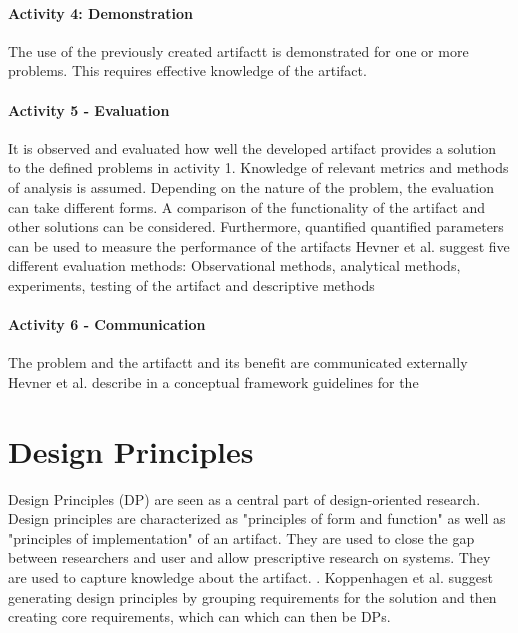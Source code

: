 \paragraph{Activity 4: Demonstration}
The use of the previously created artifactt is demonstrated for one or more problems.
This requires effective knowledge of the artifact.
\cite[p. 55]{peffers_designscienceresearch_2007}

\paragraph{Activity 5 - Evaluation}
It is observed and evaluated how well the developed artifact provides a solution to the defined
problems in activity 1.
Knowledge of relevant metrics and methods of analysis is assumed. Depending on the nature of the
problem, the evaluation can take different forms.
A comparison of the functionality of the artifact and other solutions can be considered.
Furthermore, quantified
quantified parameters can be used to measure the performance of the artifacts
\cite[p. 56]{peffers_designscienceresearch_2007}
Hevner et al. suggest five different evaluation methods: Observational
methods, analytical methods, experiments, testing of the artifact and descriptive
methods
\cite[p. 87]{hevner_designscienceinformation_2004}

\paragraph{Activity 6 - Communication}
The problem and the artifactt and its benefit are communicated externally
\cite[p. 56]{peffers_designscienceresearch_2007}
Hevner et al. describe in a conceptual framework guidelines for the


\section{Design Principles}


Design Principles (DP) are seen as a central part of design-oriented research.
\cite[p. 348]{gregor_positioningpresentingdesign_2013}
Design principles are characterized as "principles of form and function" as well as "principles
of implementation" of an artifact.
\cite[p.8]{gregor_anatomydesigntheory_}
They are used to close the gap between researchers and user and allow prescriptive research on
systems. They are used to capture knowledge about the artifact.
\cite[pp. 37-56]{sein_actiondesignresearch_2011}.
Koppenhagen et al. suggest generating design principles by grouping requirements for the solution
and then creating core requirements, which can
which can then be DPs.
\cite[p. 6]{koppenhagen_designscienceresearch_2012}


